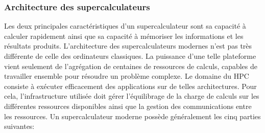         
    
        
    \subsubsection{Architecture des supercalculateurs}
    
        Les deux principales caractéristiques d'un supercalculateur sont sa capacité à calculer rapidement ainsi que sa capacité à mémoriser les informations et les résultats produits. L'architecture des supercalculateurs modernes n'est pas très différente de celle des ordinateurs classiques. La puissance d'une telle plateforme vient seulement de l'agrégation de centaines de ressources de calculs, capables de travailler ensemble pour résoudre un problème complexe. Le domaine du HPC consiste à exécuter efficacement des applications sur de telles architectures. Pour cela, l'infrastructure utilisée doit gérer l'équilibrage de la charge de calculs sur les différentes ressources disponibles ainsi que la gestion des communications entre les ressources. Un supercalculateur moderne possède généralement les cinq parties suivantes:
      

